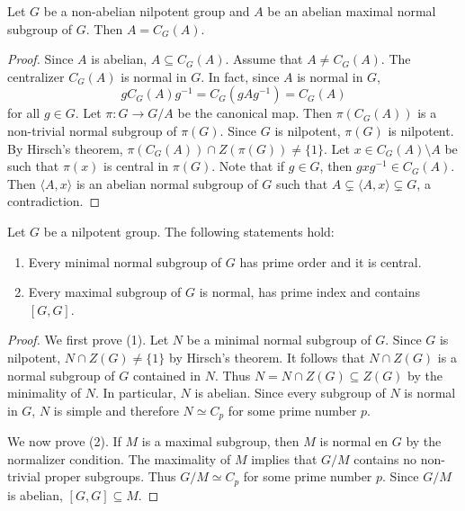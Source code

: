\begin{corollary}
	Let $G$ be a non-abelian nilpotent group and $A$ be an abelian 
	maximal normal subgroup of $G$. Then $A=C_G(A)$.
\end{corollary}

\begin{proof}
	Since $A$ is abelian, $A\subseteq C_G(A)$. Assume that $A\ne C_G(A)$.
	The centralizer $C_G(A)$ is normal in $G$. In fact, since $A$ is normal in $G$, 
	\[
		gC_G(A)g^{-1}=C_G(gAg^{-1})=C_G(A)
	\]
	for all $g\in G$.  Let $\pi\colon G\to G/A$ be the canonical map.
	Then $\pi(C_G(A))$ is a non-trivial normal subgroup of $\pi(G)$. Since 
	$G$ is nilpotent, $\pi(G)$ is nilpotent. By Hirsch's theorem, 
	$\pi(C_G(A))\cap Z(\pi(G))\ne\{1\}$. Let
	$x\in C_G(A)\setminus A$ be such that $\pi(x)$ is central in $\pi(G)$. 
	Note that if $g\in G$, then $gxg^{-1}\in C_G(A)$. 
	Then 
	$\langle A,x\rangle$ is an abelian normal subgroup of $G$ such that   
	$A\subsetneq \langle
	A,x\rangle\subsetneq G$, a contradiction. 
\end{proof}

\begin{theorem}
	Let $G$ be a nilpotent group. The following statements hold:
	\begin{enumerate}
		\item Every minimal normal subgroup of $G$ has prime order and it is central. 
		\item Every maximal subgroup of $G$ is normal, has prime index and contains $[G,G]$. 
	\end{enumerate}
\end{theorem}

\begin{proof}
	We first prove (1). Let $N$ be a minimal normal subgroup of $G$. Since $G$ is nilpotent, 
	$N\cap Z(G)\ne\{1\}$ by Hirsch's theorem. It follows that $N\cap Z(G)$ is a normal subgroup of $G$ contained in $N$. 
	Thus $N=N\cap Z(G)\subseteq
	Z(G)$ by the minimality of $N$. In particular, $N$ is abelian. Since 
	every subgroup of $N$ is normal in $G$, $N$ is simple and therefore $N\simeq
	C_p$ for some prime number $p$.

	We now prove (2). If $M$ is a maximal subgroup, then $M$
	is normal en $G$ by the normalizer condition. The maximality of $M$ implies that 
	$G/M$ contains no non-trivial proper subgroups. Thus 
	$G/M\simeq C_p$ for some prime number $p$. Since  
	$G/M$ is abelian, $[G,G]\subseteq M$. 
\end{proof}

